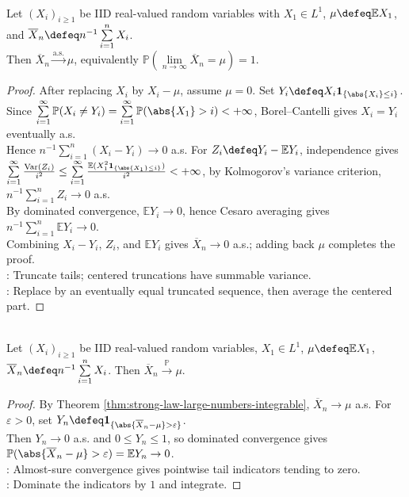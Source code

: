 \begin{theorem} \label{thm:strong-law-large-numbers-integrable} \\
Let $(X_i)_{i\geq1}$ be IID real-valued random variables with $X_1\in L^1$, $\mu\defeq\mathbb{E}X_1$, and $\overline{X}_n\defeq n^{-1}\sum\limits_{i=1}^{n}X_i$.\\
Then $\overline{X}_n\xrightarrow{\mathrm{a.s.}}\mu$, equivalently $\mathbb{P}(\lim\limits_{n\to\infty}\overline{X}_n=\mu)=1$.
\begin{proof} After replacing $X_i$ by $X_i-\mu$, assume $\mu=0$. Set $Y_i\defeq X_i\mathbf{1}_{\{\abs{X_i}\leq i\}}$.\\
Since $\sum\limits_{i=1}^{\infty}\mathbb{P}(X_i\neq Y_i)=\sum\limits_{i=1}^{\infty}\mathbb{P}(\abs{X_1}>i)<+\infty$, Borel--Cantelli gives $X_i=Y_i$ eventually a.s.\\
Hence $n^{-1}\sum\limits_{i=1}^{n}(X_i-Y_i)\to0$ a.s. For $Z_i\defeq Y_i-\mathbb{E}Y_i$, independence gives\\
$\sum\limits_{i=1}^{\infty}\frac{\operatorname{Var}(Z_i)}{i^2}\leq\sum\limits_{i=1}^{\infty}\frac{\mathbb{E}(X_1^2\mathbf{1}_{\{\abs{X_1}\leq i\}})}{i^2}<+\infty$, by Kolmogorov's variance criterion, $n^{-1}\sum\limits_{i=1}^{n}Z_i\to0$ a.s.\\
By dominated convergence, $\mathbb{E}Y_i\to0$, hence Cesaro averaging gives $n^{-1}\sum\limits_{i=1}^{n}\mathbb{E}Y_i\to0$.\\
Combining $X_i-Y_i$, $Z_i$, and $\mathbb{E}Y_i$ gives $\overline{X}_n\to0$ a.s.; adding back $\mu$ completes the proof.\\
: Truncate tails; centered truncations have summable variance.\\
: Replace by an eventually equal truncated sequence, then average the centered part.
\end{proof}
\end{theorem}

\begin{corollary} \label{cor:strong-law-implies-weak-law} \\
Let $(X_i)_{i\geq1}$ be IID real-valued random variables, $X_1\in L^1$, $\mu\defeq\mathbb{E}X_1$, $\overline{X}_n\defeq n^{-1}\sum\limits_{i=1}^{n}X_i$. Then $\overline{X}_n\xrightarrow{\mathbb{P}}\mu$.
\begin{proof} By Theorem \ref{thm:strong-law-large-numbers-integrable}, $\overline{X}_n\to\mu$ a.s. For $\varepsilon>0$, set $Y_n\defeq\mathbf{1}_{\{\abs{\overline{X}_n-\mu}>\varepsilon\}}$.\\
Then $Y_n\to0$ a.s. and $0\leq Y_n\leq1$, so dominated convergence gives $\mathbb{P}(\abs{\overline{X}_n-\mu}>\varepsilon)=\mathbb{E}Y_n\to0$.\\
: Almost-sure convergence gives pointwise tail indicators tending to zero.\\
: Dominate the indicators by $1$ and integrate.
\end{proof}
\end{corollary}

